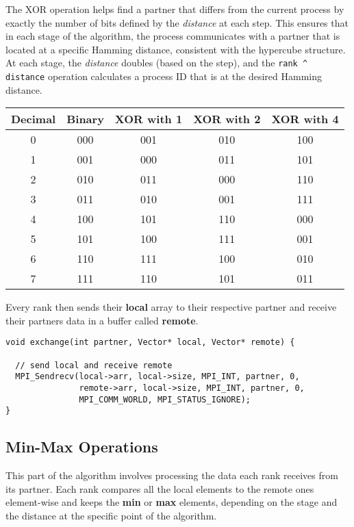 \documentclass[12pt]{report}
\begin{document}
The XOR operation helps find a partner that differs from the current process by exactly the number of bits defined by the \textit{distance} at each step. This ensures that in each stage of the algorithm, the process communicates with a partner that is located at a specific Hamming distance, consistent with the hypercube structure. At each stage, the \textit{distance} doubles (based on the step), and the \verb|rank ^ distance| operation calculates a process ID that is at the desired Hamming distance.

\vspace{1cm}
\begin{tabular}{|c|c|c|c|c|}
    \hline
    \textbf{Decimal} & \textbf{Binary} & \textbf{XOR with 1} & \textbf{XOR with 2} & \textbf{XOR with 4} \\ \hline
    0 & 000 & 001 & 010 & 100 \\ \hline
    1 & 001 & 000 & 011 & 101 \\ \hline
    2 & 010 & 011 & 000 & 110 \\ \hline
    3 & 011 & 010 & 001 & 111 \\ \hline
    4 & 100 & 101 & 110 & 000 \\ \hline
    5 & 101 & 100 & 111 & 001 \\ \hline
    6 & 110 & 111 & 100 & 010 \\ \hline
    7 & 111 & 110 & 101 & 011 \\ \hline
\end{tabular}
\vspace{1cm}
        
Every rank then sends their \textbf{local} array to their respective partner and receive their partners data in a buffer called \textbf{remote}.

\begin{lstlisting}[style=cstyle]
void exchange(int partner, Vector* local, Vector* remote) {
  
  // send local and receive remote
  MPI_Sendrecv(local->arr, local->size, MPI_INT, partner, 0,
               remote->arr, local->size, MPI_INT, partner, 0,
               MPI_COMM_WORLD, MPI_STATUS_IGNORE);
}
\end{lstlisting}

\subsection{Min-Max Operations}

This part of the algorithm involves processing the data each rank receives from its partner.  Each rank compares all the local elements to the remote ones element-wise and keeps the \textbf{min} or \textbf{max} elements, depending on the stage and the distance at the specific point of the algorithm. 
\end{document}
